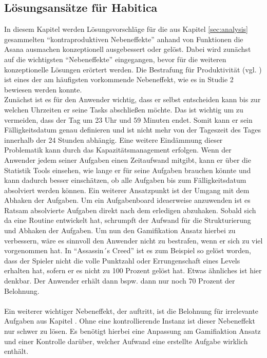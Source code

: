 \documentclass[sigconf, nonacm]{acmart}
\begin{document}
\subsection{Lösungsansätze für Habitica}\label{sec:solutions_for_habitica}
In diesem Kapitel werden Lösungsvorschläge für die aus Kapitel \ref{sec:analysis} gesammelten \enquote{kontraproduktiven Nebeneffekte} anhand von Funktionen die Asana ausmachen konzeptionell ausgebessert oder gelöst. Dabei wird zunächst auf die wichtigsten \enquote{Nebeneffekte} eingegangen, bevor für die weiteren konzeptionelle Lösungen erörtert werden.
Die Bestrafung für Produktivität (vgl. ) ist eines der am häufigsten vorkommende Nebeneffekt, wie es in Studie 2 bewiesen werden konnte. \\
Zunächst ist es für den Anwender wichtig, dass er selbst entscheiden kann bis zur welchen Uhrzeiten er seine Tasks abschließen möchte. Das ist wichtig um zu vermeiden, dass der Tag um 23 Uhr und 59 Minuten endet. Somit kann er sein Fälligkeitsdatum genau definieren und ist nicht mehr von der Tageszeit des Tages innerhalb der 24 Stunden abhängig. Eine weitere Eindämmung dieser Problematik kann durch das Kapazitätsmanagement erfolgen. Wenn der Anwender jedem seiner Aufgaben einen Zeitaufwand mitgibt, kann er über die Statistik Tools einsehen, wie lange er für seine Aufgaben brauchen könnte und kann dadurch besser einschätzen, ob alle Aufgaben bis zum Fälligkeitsdatum absolviert werden können. Ein weiterer Ansatzpunkt ist der Umgang mit dem Abhaken der Aufgaben. Um ein Aufgabenboard ideaerweise anzuwenden ist es Ratsam absolvierte Aufgaben direkt nach dem erledigen abzuhaken. Sobald sich da eine Routine entwickelt hat, schrumpft der Aufwand für die Strukturierung und Abhaken der Aufgaben.
Um nun den Gamifikation Ansatz hierbei zu verbessern, wäre es sinnvoll den Anwender nicht zu bestrafen, wenn er sich zu viel vorgenommen hat. In \enquote{Assassin´s Creed} ist es zum Beispiel so gelöst worden, dass der Spieler nicht die volle Punktzahl oder Errungenschaft eines Levels erhalten hat, sofern er es nicht zu 100 Prozent gelöst hat. Etwas ähnliches ist hier denkbar. Der Anwender erhält dann bspw. dann nur noch 70 Prozent der Belohnung.~\cite{noauthor_assassins_nodate}
\\
\\
Ein weiterer wichtiger Nebeneffekt, der auftritt, ist die Belohnung für irrelevante Aufgaben aus Kapitel  . 
Ohne eine kontrollierende Instanz ist dieser Nebeneffekt nur schwer zu lösen. Es benötigt hierbei eine Anpassung am Gamifiaktion Ansatz und einer Kontrolle darüber, welcher Aufwand eine erstellte Aufgabe wirklich enthält.
 
\end{document}

